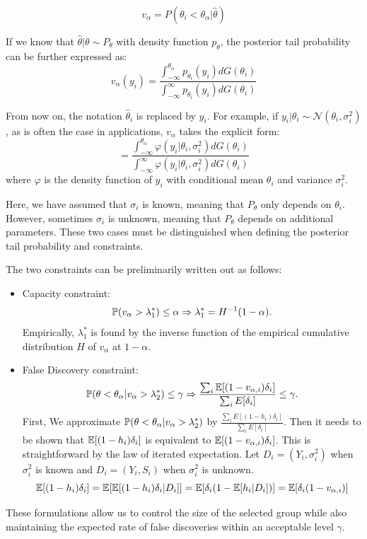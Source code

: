 \documentclass[12pt]{article}
\begin{document}
\begin{equation*}
    v_\alpha=P( \theta_i < \theta_{\alpha} |\hat{\theta})
\end{equation*}

If we know that \(\hat{\theta}|\theta \sim P_\theta\) with density function
\(p_\theta\), the posterior tail probability can be further expressed as:
\begin{equation*}
    v_\alpha(y_i) = \frac{\int_{-\infty}^{\theta_{\alpha}} p_{\theta_i}(y_i) dG(\theta_i)}
    {\int_{-\infty}^{\infty} p_{\theta_i}(y_i) dG(\theta_i)}
\end{equation*}

From now on, the notation \(\hat{\theta}_i\) is replaced by \(y_i\). For
example, if \(y_i|\theta_i \sim \mathcal{N}(\theta_i, \sigma_i^2)\), as is
often the case in applications, \(v_\alpha\) takes the explicit form:
\begin{equation*}
    = \frac{\int_{-\infty}^{\theta_{\alpha}} \varphi(y_i | \theta_i, \sigma_i^2) dG(\theta_i)}
    {\int_{-\infty}^{\infty} \varphi(y_i | \theta_i, \sigma_i^2) dG(\theta_i)}
\end{equation*}
where \(\varphi\) is the density function of \(y_i\) with conditional mean \(\theta_i\) and variance \(\sigma_i^2\).

Here, we have assumed that \(\sigma_i\) is known, meaning that \(P_\theta\)
only depends on \(\theta_i\). However, sometimes \(\sigma_i\) is unknown,
meaning that \(P_\theta\) depends on additional parameters. These two cases
must be distinguished when defining the posterior tail probability and
constraints.

The two constraints can be preliminarily written out as follows:
\begin{itemize}
    \item Capacity constraint: \[ \mathbb{P}(v_\alpha>\lambda_1^*) \le \alpha \Rightarrow \lambda_1^* = H^{-1}(1-\alpha). \] Empirically, $\lambda_1^*$ is found by the inverse function of the empirical
          cumulative distribution $H$ of $v_\alpha$ at $1-\alpha$.
    \item False Discovery constraint: \[ \mathbb{P}(\theta<\theta_\alpha|v_\alpha>\lambda_2^*) \le \gamma \Rightarrow  \frac{\sum_i \mathbb{E}[(1-v_{\alpha,i})\delta_i]}{\sum_i E[ \delta_i]}\le \gamma.\] First, We approximate $\mathbb{P}(\theta<\theta_\alpha|v_\alpha>\lambda_2^*)$ by
          $\frac{\sum_i E[ (1-h_i)\delta_i]}{\sum_i E[ \delta_i]}$. Then it needs to be
          shown that $\mathbb{E}[ (1-h_i)\delta_i]$ is equivalent to
          $\mathbb{E}[(1-v_{\alpha,i})\delta_i]$. This is straightforward by the law of iterated
          expectation. Let $D_i = (Y_i,\sigma_i^2)$ when $\sigma_i^2$ is known and $D_i =
              (Y_i,S_i)$ when $\sigma_i^2$ is unknown.
          \[ \mathbb{E}[(1-h_i)\delta_i] = \mathbb{E}[\mathbb{E}[(1-h_i)\delta_i|D_i]] = \mathbb{E}[\delta_i(1-\mathbb{E}[h_i|D_i])] = \mathbb{E}[\delta_i(1-v_{\alpha,i})] \]
\end{itemize}
These formulations allow us to control the size of the selected group while also maintaining the expected rate of false discoveries within an acceptable level \(\gamma\).
\end{document}
